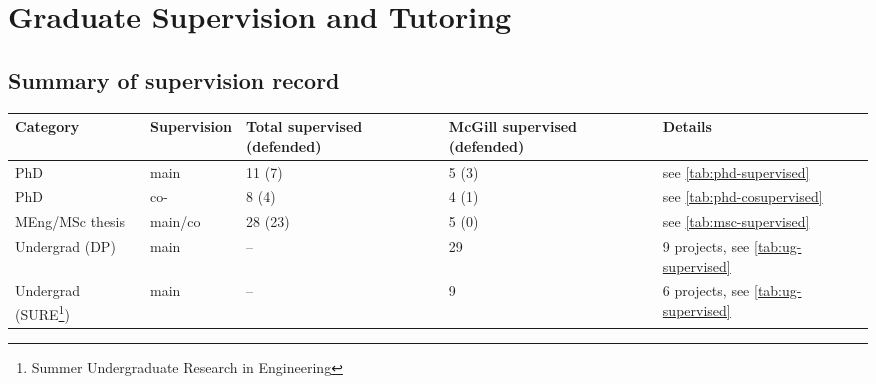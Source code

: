 \section{Graduate Supervision and Tutoring}

\subsection{Summary of supervision record}


\begin{table}[htb]
\footnotesize
\begin{tabular}{@{}p{3cm}lp{2.5cm}p{2.7cm}p{3.5cm}@{}}
\toprule
\textbf{Category} & \textbf{Supervision} & \textbf{Total supervised (defended)} & \textbf{McGill supervised (defended)} & \textbf{Details} \\
\midrule
PhD & main & 11 (7) & 5 (3) & see \autoref{tab:phd-supervised}  \\
PhD & co- & 8 (4) & 4 (1) & see \autoref{tab:phd-cosupervised} \\
MEng/MSc thesis & main/co & 28 (23) & 5 (0) & see \autoref{tab:msc-supervised} \\
Undergrad (DP) & main & -- & 29 & 9 projects, see \autoref{tab:ug-supervised} \\ %
Undergrad (SURE\footnote{Summer Undergraduate Research in Engineering})  & main & -- & 9 & 6 projects, see \autoref{tab:ug-supervised} \\
\bottomrule
\end{tabular}
\end{table}



